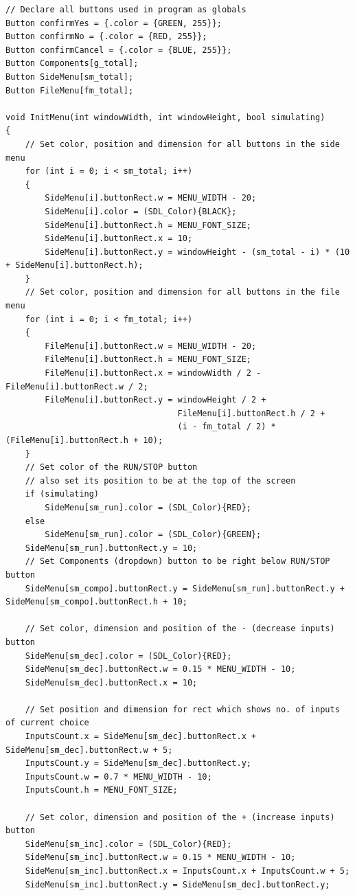 \documentclass[report]{subfiles}
\begin{document}
    \begin{lstlisting}
// Declare all buttons used in program as globals
Button confirmYes = {.color = {GREEN, 255}};
Button confirmNo = {.color = {RED, 255}};
Button confirmCancel = {.color = {BLUE, 255}};
Button Components[g_total];
Button SideMenu[sm_total];
Button FileMenu[fm_total];

void InitMenu(int windowWidth, int windowHeight, bool simulating)
{
    // Set color, position and dimension for all buttons in the side menu
    for (int i = 0; i < sm_total; i++)
    {
        SideMenu[i].buttonRect.w = MENU_WIDTH - 20;
        SideMenu[i].color = (SDL_Color){BLACK};
        SideMenu[i].buttonRect.h = MENU_FONT_SIZE;
        SideMenu[i].buttonRect.x = 10;
        SideMenu[i].buttonRect.y = windowHeight - (sm_total - i) * (10 + SideMenu[i].buttonRect.h);
    }
    // Set color, position and dimension for all buttons in the file menu
    for (int i = 0; i < fm_total; i++)
    {
        FileMenu[i].buttonRect.w = MENU_WIDTH - 20;
        FileMenu[i].buttonRect.h = MENU_FONT_SIZE;
        FileMenu[i].buttonRect.x = windowWidth / 2 - FileMenu[i].buttonRect.w / 2;
        FileMenu[i].buttonRect.y = windowHeight / 2 +
                                   FileMenu[i].buttonRect.h / 2 +
                                   (i - fm_total / 2) * (FileMenu[i].buttonRect.h + 10);
    }
    // Set color of the RUN/STOP button
    // also set its position to be at the top of the screen 
    if (simulating)
        SideMenu[sm_run].color = (SDL_Color){RED};
    else
        SideMenu[sm_run].color = (SDL_Color){GREEN};
    SideMenu[sm_run].buttonRect.y = 10;
    // Set Components (dropdown) button to be right below RUN/STOP button
    SideMenu[sm_compo].buttonRect.y = SideMenu[sm_run].buttonRect.y + SideMenu[sm_compo].buttonRect.h + 10;

    // Set color, dimension and position of the - (decrease inputs) button
    SideMenu[sm_dec].color = (SDL_Color){RED};
    SideMenu[sm_dec].buttonRect.w = 0.15 * MENU_WIDTH - 10;
    SideMenu[sm_dec].buttonRect.x = 10;

    // Set position and dimension for rect which shows no. of inputs of current choice
    InputsCount.x = SideMenu[sm_dec].buttonRect.x + SideMenu[sm_dec].buttonRect.w + 5;
    InputsCount.y = SideMenu[sm_dec].buttonRect.y;
    InputsCount.w = 0.7 * MENU_WIDTH - 10;
    InputsCount.h = MENU_FONT_SIZE;

    // Set color, dimension and position of the + (increase inputs) button
    SideMenu[sm_inc].color = (SDL_Color){RED};
    SideMenu[sm_inc].buttonRect.w = 0.15 * MENU_WIDTH - 10;
    SideMenu[sm_inc].buttonRect.x = InputsCount.x + InputsCount.w + 5;
    SideMenu[sm_inc].buttonRect.y = SideMenu[sm_dec].buttonRect.y;


\end{lstlisting}
\end{document}
